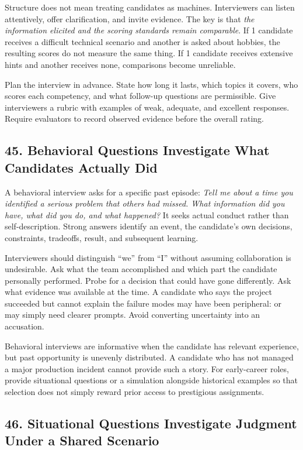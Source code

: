 Structure does not mean treating candidates as machines. Interviewers can listen attentively, offer clarification, and invite evidence. The key is that \textit{the information elicited and the scoring standards remain comparable}. If 1 candidate receives a difficult technical scenario and another is asked about hobbies, the resulting scores do not measure the same thing. If 1 candidate receives extensive hints and another receives none, comparisons become unreliable.

Plan the interview in advance. State how long it lasts, which topics it covers, who scores each competency, and what follow-up questions are permissible. Give interviewers a rubric with examples of weak, adequate, and excellent responses. Require evaluators to record observed evidence before the overall rating.

\subsection*{45. Behavioral Questions Investigate What Candidates Actually Did}

A behavioral interview asks for a specific past episode: \textit{Tell me about a time you identified a serious problem that others had missed. What information did you have, what did you do, and what happened?} It seeks actual conduct rather than self-description. Strong answers identify an event, the candidate's own decisions, constraints, tradeoffs, result, and subsequent learning.

Interviewers should distinguish ``we'' from ``I'' without assuming collaboration is undesirable. Ask what the team accomplished and which part the candidate personally performed. Probe for a decision that could have gone differently. Ask what evidence was available at the time. A candidate who says the project succeeded but cannot explain the failure modes may have been peripheral: or may simply need clearer prompts. Avoid converting uncertainty into an accusation.

Behavioral interviews are informative when the candidate has relevant experience, but past opportunity is unevenly distributed. A candidate who has not managed a major production incident cannot provide such a story. For early-career roles, provide situational questions or a simulation alongside historical examples so that selection does not simply reward prior access to prestigious assignments.

\subsection*{46. Situational Questions Investigate Judgment Under a Shared Scenario}

